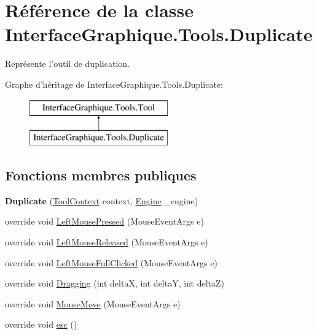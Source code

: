\hypertarget{class_interface_graphique_1_1_tools_1_1_duplicate}{\section{Référence de la classe Interface\-Graphique.\-Tools.\-Duplicate}
\label{class_interface_graphique_1_1_tools_1_1_duplicate}
}


Représente l'outil de duplication.  


Graphe d'héritage de Interface\-Graphique.\-Tools.\-Duplicate\-:\begin{figure}[H]
\begin{center}
\leavevmode
\includegraphics[height=2.000000cm]{class_interface_graphique_1_1_tools_1_1_duplicate}
\end{center}
\end{figure}
\subsection*{Fonctions membres publiques}
\begin{DoxyCompactItemize}
\item 
\hypertarget{class_interface_graphique_1_1_tools_1_1_duplicate_a4537f9c39028b8e04820cb054f7d8ffa}{{\bfseries Duplicate} (\hyperlink{class_interface_graphique_1_1_tools_1_1_tool_context}{Tool\-Context} context, \hyperlink{class_interface_graphique_1_1_engine}{Engine} \-\_\-engine)}\label{class_interface_graphique_1_1_tools_1_1_duplicate_a4537f9c39028b8e04820cb054f7d8ffa}

\item 
override void \hyperlink{class_interface_graphique_1_1_tools_1_1_duplicate_ab3771a3f6ead534124feaf89f542a910}{Left\-Mouse\-Pressed} (Mouse\-Event\-Args e)
\item 
override void \hyperlink{class_interface_graphique_1_1_tools_1_1_duplicate_a23482008d3d07f80d4b5b9db77fd63c9}{Left\-Mouse\-Released} (Mouse\-Event\-Args e)
\item 
override void \hyperlink{class_interface_graphique_1_1_tools_1_1_duplicate_a55a29f559ad9051390f107b34cd667a6}{Left\-Mouse\-Full\-Clicked} (Mouse\-Event\-Args e)
\item 
override void \hyperlink{class_interface_graphique_1_1_tools_1_1_duplicate_a92888a92cbdd84f7c617b82dde014c0f}{Dragging} (int delta\-X, int delta\-Y, int delta\-Z)
\item 
override void \hyperlink{class_interface_graphique_1_1_tools_1_1_duplicate_aa8bb7b1bf21dceacd60ac1a502c31a40}{Mouse\-Move} (Mouse\-Event\-Args e)
\item 
override void \hyperlink{class_interface_graphique_1_1_tools_1_1_duplicate_a52769869afe558c10ec13bbc54d896f3}{esc} ()
\end{DoxyCompactItemize}
